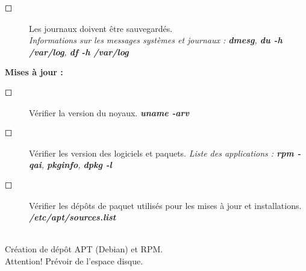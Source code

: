 \documentclass[a4paper,11pt]{article}				    %
\begin{document}
{\begin{description}
	\item[$\Square$] Les journaux doivent \^etre sauvegard\'es.\\
	{\sl \color{blue} Informations sur les messages syst\`emes et journaux : \textbf{dmesg}, \textbf{du -h /var/log}, \textbf{df -h /var/log}} 

\end{description}
\vskip-0.1cm
\textbf{Mises \`a jour :}
\begin{description}
	\item[$\Square$] V\'erifier la version du noyaux. 
{\sl \color{blue}\textbf{uname -arv}}

	\item[$\Square$] V\'erifier les version des logiciels et paquets. 
{\sl \color{blue}Liste des applications : \textbf{rpm -qai}, \textbf{pkginfo}, \textbf{dpkg -l}}

	\item[$\Square$] V\'erifier les d\'ep\^ots de paquet utilis\'es pour les mises \`a jour et installations. 
{\sl \color{blue}\textbf{/etc/apt/sources.list}}

\end{description}
}
{
\\Cr\'eation de d\'ep\^ot APT (Debian) et RPM.\\ Attention! Pr\'evoir de l'espace disque.
}
\end{document}
